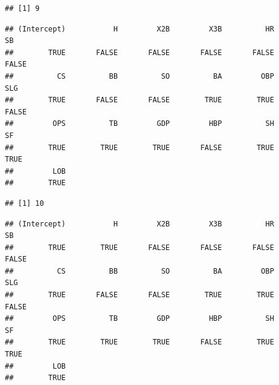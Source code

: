 \documentclass[
  11pt,
]{book}
\newenvironment{Shaded}{\begin{snugshade}}{\end{snugshade}}
\newcommand{\CommentTok}[1]{\textcolor[rgb]{0.56,0.35,0.01}{\textit{#1}}}
\newcommand{\FunctionTok}[1]{\textcolor[rgb]{0.00,0.00,0.00}{#1}}
\newcommand{\NormalTok}[1]{#1}
\newcommand{\SpecialCharTok}[1]{\textcolor[rgb]{0.00,0.00,0.00}{#1}}
\theoremstyle{definition}
\theoremstyle{definition}
\theoremstyle{definition}
\theoremstyle{definition}
\theoremstyle{remark}
\begin{document}
\begin{Shaded}
\end{Shaded}

\begin{verbatim}
## [1] 9
\end{verbatim}

\begin{Shaded}
\end{Shaded}

\begin{verbatim}
## (Intercept)           H         X2B         X3B          HR          SB 
##        TRUE       FALSE       FALSE       FALSE       FALSE       FALSE 
##          CS          BB          SO          BA         OBP         SLG 
##        TRUE       FALSE       FALSE        TRUE        TRUE       FALSE 
##         OPS          TB         GDP         HBP          SH          SF 
##        TRUE        TRUE        TRUE       FALSE        TRUE        TRUE 
##         LOB 
##        TRUE
\end{verbatim}

\begin{Shaded}
\end{Shaded}

\begin{verbatim}
## [1] 10
\end{verbatim}

\begin{Shaded}
\end{Shaded}

\begin{verbatim}
## (Intercept)           H         X2B         X3B          HR          SB 
##        TRUE        TRUE       FALSE       FALSE       FALSE       FALSE 
##          CS          BB          SO          BA         OBP         SLG 
##        TRUE       FALSE       FALSE        TRUE        TRUE       FALSE 
##         OPS          TB         GDP         HBP          SH          SF 
##        TRUE        TRUE        TRUE       FALSE        TRUE        TRUE 
##         LOB 
##        TRUE
\end{verbatim}
\end{document}
